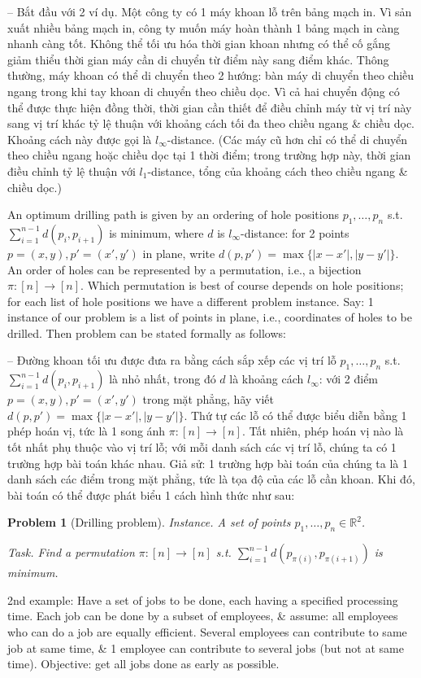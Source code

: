 \documentclass{article}
\newtheorem{problem}{Problem}
\begin{document}
\begin{itemize}
    -- Bắt đầu với 2 ví dụ. Một công ty có 1 máy khoan lỗ trên bảng mạch in. Vì sản xuất nhiều bảng mạch in, công ty muốn máy hoàn thành 1 bảng mạch in càng nhanh càng tốt. Không thể tối ưu hóa thời gian khoan nhưng có thể cố gắng giảm thiểu thời gian máy cần di chuyển từ điểm này sang điểm khác. Thông thường, máy khoan có thể di chuyển theo 2 hướng: bàn máy di chuyển theo chiều ngang trong khi tay khoan di chuyển theo chiều dọc. Vì cả hai chuyển động có thể được thực hiện đồng thời, thời gian cần thiết để điều chỉnh máy từ vị trí này sang vị trí khác tỷ lệ thuận với khoảng cách tối đa theo chiều ngang \& chiều dọc. Khoảng cách này được gọi là $l_\infty$-distance. (Các máy cũ hơn chỉ có thể di chuyển theo chiều ngang hoặc chiều dọc tại 1 thời điểm; trong trường hợp này, thời gian điều chỉnh tỷ lệ thuận với $l_1$-distance, tổng của khoảng cách theo chiều ngang \& chiều dọc.)

    An optimum drilling path is given by an ordering of hole positions $p_1,\ldots,p_n$ s.t. $\sum_{i=1}^{n-1} d(p_i,p_{i+1})$ is minimum, where $d$ is $l_\infty$-distance: for 2 points $p = (x,y),p' = (x',y')$ in plane, write $d(p,p') = \max\{|x - x'|,|y - y'|\}$. An order of holes can be represented by a permutation, i.e., a bijection $\pi:[n]\to[n]$. Which permutation is best of course depends on hole positions; for each list of hole positions we have a different problem instance. Say: 1 instance of our problem is a list of points in plane, i.e., coordinates of holes to be drilled. Then problem can be stated formally as follows:

    -- Đường khoan tối ưu được đưa ra bằng cách sắp xếp các vị trí lỗ $p_1,\ldots,p_n$ s.t. $\sum_{i=1}^{n-1} d(p_i,p_{i+1})$ là nhỏ nhất, trong đó $d$ là khoảng cách $l_\infty$: với 2 điểm $p = (x,y),p' = (x',y')$ trong mặt phẳng, hãy viết $d(p,p') = \max\{|x - x'|,|y - y'|\}$. Thứ tự các lỗ có thể được biểu diễn bằng 1 phép hoán vị, tức là 1 song ánh $\pi:[n]\to[n]$. Tất nhiên, phép hoán vị nào là tốt nhất phụ thuộc vào vị trí lỗ; với mỗi danh sách các vị trí lỗ, chúng ta có 1 trường hợp bài toán khác nhau. Giả sử: 1 trường hợp bài toán của chúng ta là 1 danh sách các điểm trong mặt phẳng, tức là tọa độ của các lỗ cần khoan. Khi đó, bài toán có thể được phát biểu 1 cách hình thức như sau:

    \begin{problem}[Drilling problem]
        \item {\sf Instance.} A set of points $p_1,\ldots,p_n\in\mathbb{R}^2$.
        \item {\sf Task.} Find a permutation $\pi:[n]\to[n]$ s.t. $\sum_{i=1}^{n-1} d(p_{\pi(i)},p_{\pi(i + 1)})$ is minimum.
    \end{problem}
    2nd example: Have a set of jobs to be done, each having a specified processing time. Each job can be done by a subset of employees, \& assume: all employees who can do a job are equally efficient. Several employees can contribute to same job at same time, \& 1 employee can contribute to several jobs (but not at same time). Objective: get all jobs done as early as possible.


\end{itemize}
\end{document}
